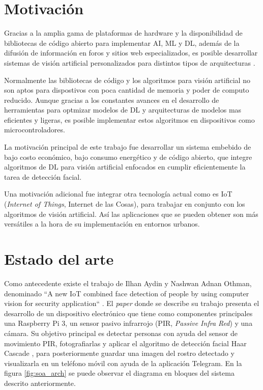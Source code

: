 \section{Motivación}
Gracias a la amplia gama de plataformas de hardware y la disponibilidad de bibliotecas de código abierto para implementar AI, ML y DL, además de la difusión de información en foros y sitios web especializados, es posible desarrollar sistemas de visión artificial personalizados para distintos tipos de arquitecturas \cite{mot_emb}.

Normalmente las bibliotecas de código y los algoritmos para visión artificial no son aptos para dispostivos con poca cantidad de memoria y poder de computo reducido. Aunque gracias a los constantes avances en el desarrollo de herramientas para optmizar modelos de DL y arquitecturas de modelos mas eficientes y ligeras, es posible implementar estos algoritmos en dispositivos como microcontroladores.

La motivación principal de este trabajo fue desarrollar un sistema embebido de bajo costo económico, bajo consumo energético y de código abierto, que integre algoritmos de DL para visión artificial enfocados en cumplir eficientemente la tarea de detección facial.

Una motivación adicional fue integrar otra tecnología actual como es IoT (\textit{Internet of Things}, Internet de las Cosas), para trabajar en conjunto con los algoritmos de visión artificial. Así las aplicaciones que se pueden obtener son más versátiles a la hora de su implementación en entornos urbanos.

\section{Estado del arte}
Como antecedente existe el trabajo de Ilhan Aydin y Nashwan Adnan Othman, denominado ``A new IoT combined face detection of people by using computer vision for security application`` \cite{soa_ref}. El \textit{paper} donde se describe su trabajo presenta el desarrollo de un dispositivo electrónico que tiene como componentes principales una Raspberry Pi 3, un sensor pasivo infrarrojo (PIR, \textit{Passive Infra Red}) y una cámara. Su objetivo principal es detectar personas con ayuda del sensor de movimiento PIR, fotografiarlas y aplicar el algoritmo de detección facial Haar Cascade \cite{haar_cascade}, para posteriormente guardar una imagen del rostro detectado y visualizarla en un teléfono móvil con ayuda de la aplicación Telegram. En la figura \ref{fig:soa_arch} se puede observar el diagrama en bloques del sistema descrito anteriormente.

